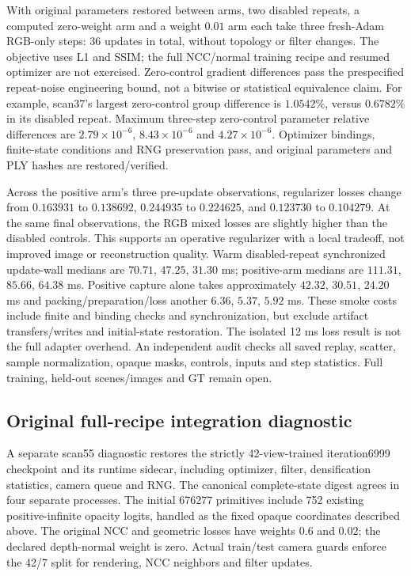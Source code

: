 \documentclass[11pt,a4paper]{article}
\begin{document}
With original parameters restored between arms, two disabled repeats,
a computed zero-weight arm and a weight $0.01$ arm each take three
fresh-Adam RGB-only steps: 36 updates in total, without topology or
filter changes. The objective uses L1 and SSIM; the full NCC/normal
training recipe and resumed optimizer are not exercised. Zero-control
gradient differences pass the prespecified repeat-noise engineering
bound, not a bitwise or statistical equivalence claim. For example,
scan37's largest zero-control group difference is $1.0542\%$, versus
$0.6782\%$ in its disabled repeat. Maximum three-step zero-control
parameter relative differences are $2.79\times10^{-6}$,
$8.43\times10^{-6}$ and $4.27\times10^{-6}$. Optimizer bindings,
finite-state conditions and RNG preservation pass, and original
parameters and PLY hashes are restored/verified.

Across the positive arm's three pre-update observations, regularizer
losses change from $0.163931$ to $0.138692$, $0.244935$ to $0.224625$,
and $0.123730$ to $0.104279$. At the same final observations, the RGB
mixed losses are slightly higher than the disabled controls. This
supports an operative regularizer with a local tradeoff, not improved
image or reconstruction quality. Warm disabled-repeat synchronized
update-wall medians are $70.71$, $47.25$, $31.30$ ms; positive-arm
medians are $111.31$, $85.66$, $64.38$ ms. Positive capture alone takes
approximately $42.32$, $30.51$, $24.20$ ms and packing/preparation/loss
another $6.36$, $5.37$, $5.92$ ms. These smoke costs include finite and
binding checks and synchronization, but exclude artifact transfers/writes
and initial-state restoration. The isolated 12 ms loss result is not
the full adapter overhead. An independent audit checks all saved replay,
scatter, sample normalization, opaque masks, controls, inputs and step
statistics. Full training, held-out scenes/images and GT remain open.

\subsection{Original full-recipe integration diagnostic}
A separate scan55 diagnostic restores the strictly 42-view-trained
iteration6999 checkpoint and its runtime sidecar, including optimizer,
filter, densification statistics, camera queue and RNG. The canonical
complete-state digest agrees in four separate processes. The initial
676277 primitives include 752 existing positive-infinite opacity logits,
handled as the fixed opaque coordinates described above. The original
NCC and geometric losses have weights $0.6$ and $0.02$; the declared
depth-normal weight is zero. Actual train/test camera guards enforce
the 42/7 split for rendering, NCC neighbors and filter updates.
\end{document}
